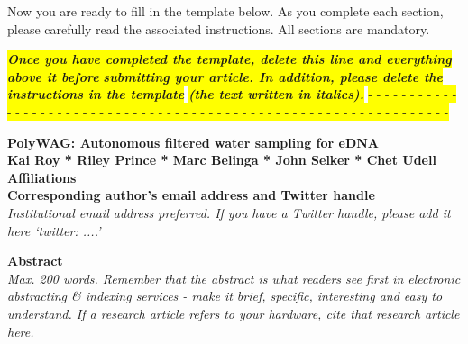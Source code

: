 \documentclass[11pt, letterpaper]{article}
\begin{document}
\begin{flushleft}
Now you are ready to fill in the template below. As you complete each section, please carefully read the associated instructions. All sections are mandatory.
\begin{center}
\colorbox{yellow}{\textbf{ \textit{ Once you have completed the template, delete this line and everything above it before} }}
\colorbox{yellow}{\textbf{ \textit{ submitting your article. In addition, please delete the instructions in the template}}} 
\colorbox{yellow}{\textbf{ \textit{  (the text written in italics).}}}
\colorbox{yellow}{- - - - - - - - - - - - - - - - - - - - - - - - - - - - - - - - - - - - - - - - - - - - - - - - - - - - - - - - - - - - - - - - }
\end{center}



\setlength{\parindent}{0pt}
\setlength{\parskip}{10pt}

\textbf{PolyWAG: Autonomous filtered water sampling for eDNA}\\ 


\textbf{Kai Roy * Riley Prince * Marc Belinga * John Selker * Chet Udell}\\ 


\textbf{Affiliations}\\ 


\textbf{Corresponding author’s email address and Twitter handle}\\ \textit{Institutional email address preferred. If you have a Twitter handle, please add it here ‘twitter: \@....’}

\textbf{Abstract}\\ \textit{Max. 200 words. Remember that the abstract is what readers see first in electronic abstracting \& indexing services - make it brief, specific, interesting and easy to understand. If a research article refers to your hardware, cite that research article here.}


\end{flushleft}
\end{document}
